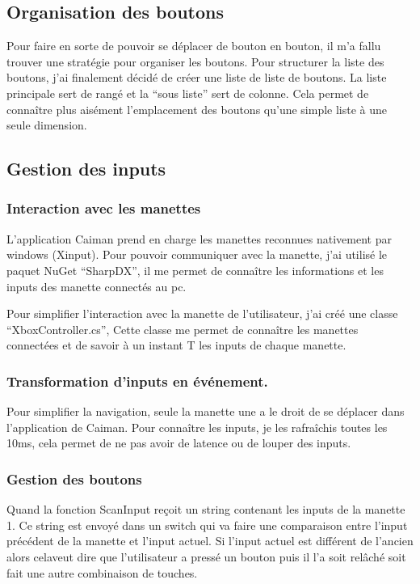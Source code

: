 \documentclass[a4paper,12pt,french]{sphinxmanual}
\begin{document}
\sphinxAtStartPar
{}


\subsection{Organisation des boutons}
\label{\detokenize{organique:organisation-des-boutons}}
\sphinxAtStartPar
Pour faire en sorte de pouvoir se déplacer de bouton en bouton, il m’a fallu trouver une stratégie pour organiser les boutons. Pour structurer la liste des boutons, j’ai finalement décidé de créer une liste de liste de boutons. La liste principale sert de rangé et la “sous liste” sert de colonne. Cela permet de connaître plus aisément l’emplacement des boutons qu’une simple liste à une seule dimension.


\subsection{Gestion des inputs}
\label{\detokenize{organique:gestion-des-inputs}}

\subsubsection{Interaction avec les manettes}
\label{\detokenize{organique:interaction-avec-les-manettes}}
\sphinxAtStartPar
L’application Caiman prend en charge les manettes reconnues nativement par windows (Xinput). Pour pouvoir communiquer avec la manette, j’ai utilisé le paquet NuGet “SharpDX”, il me permet de connaître les informations et les inputs des manette connectés au pc.

\sphinxAtStartPar
Pour simplifier l’interaction avec la manette de l’utilisateur, j’ai créé une classe “XboxController.cs”, Cette classe me permet de connaître les manettes connectées et de savoir à un instant T les inputs de chaque manette.


\subsubsection{Transformation d’inputs en événement.}
\label{\detokenize{organique:transformation-dinputs-en-evenement}}
\sphinxAtStartPar
Pour simplifier la navigation, seule la manette une a le droit de se déplacer dans l’application de Caiman. Pour connaître les inputs, je les rafraîchis toutes les 10ms, cela permet de ne pas avoir de latence ou de louper des inputs.


\subsubsection{Gestion des boutons}
\label{\detokenize{organique:gestion-des-boutons}}
\sphinxAtStartPar
Quand la fonction ScanInput reçoit un string contenant les inputs de la manette 1. Ce string est envoyé dans un switch qui va faire une comparaison entre l’input précédent de la manette et l’input actuel. Si l’input actuel est différent de l’ancien alors celaveut dire que l’utilisateur a pressé un bouton puis il l’a soit relâché soit fait une autre combinaison de touches.
\end{document}
